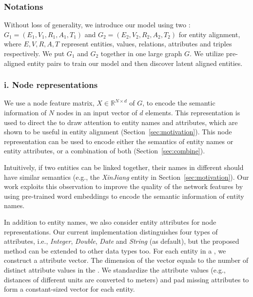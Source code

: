 \subsubsection{Notations}

Without loss of generality, we introduce our model using two \KGs: $G_1 = (E_1,V_1,R_1,A_1,T_1)$ and $G_2 = (E_2,V_2,R_2,A_2,T_2)$ for
entity alignment, where $E,V,R,A,T$ represent entities, values, relations, attributes and triples respectively. 	We put $G_1$ and $G_2$
together in one large graph $G$. We utilize pre-aligned entity pairs to train our model and then discover latent aligned entities.

%



\subsubsection{i. Node representations}
	\label{subsection:Node Representations}
   We use a node feature matrix, $X \in \mathbb{R}^{N \times d}$ of $G$, to encode the semantic information of $N$  nodes in an
   input vector of $d$ elements. This representation is used to direct the \RGCN to draw attention to entity names and attributes, which are shown to be
   useful in entity alignment (Section~\ref{sec:motivation}). This node representation can be used to encode either the semantics of entity names
   or entity attributes, or a combination of both (Section~\ref{sec:combine}).


	
	\label{wordvector}
	Intuitively, if two entities can be linked together, their names in different \KGs should have similar semantics (e.g., the \emph{XinJiang} entity in Section~\ref{sec:motivation}).
    Our work exploits this observation to improve the quality of the network features by using pre-trained word embeddings to encode the semantic
    information of entity names.

	
    In addition to entity names, we also consider entity attributes for node representations.
	Our current implementation distinguishes four types of attributes, i.e., \emph{Integer}, \emph{Double}, \emph{Date} and \emph{String}
    (as default), but the proposed method can be extended to other data types too.
%	
	For each entity in a \KG, we construct a attribute vector. The dimension of the vector equals to the number of distinct attribute values in the \KG.
    We standardize the attribute values (e.g., distances of different units are converted to meters) and pad missing attributes to form a constant-sized
    vector for each entity.

